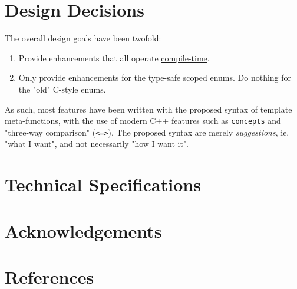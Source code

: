 \documentclass[
  format=manuscript,
  screen=true,
  review=false,
  nonacm=true,
  timestamp=true,
  balance=false]{acmart}
\begin{document}
\section{Design Decisions}

The overall design goals have been twofold:

\begin{enumerate}
\item Provide enhancements that all operate \underline{compile-time}.
\item Only provide enhancements for the type-safe scoped enums. Do nothing for the "old" C-style enums.
\end{enumerate}

\noindent
As such, most features have been written with the proposed syntax of template
meta-functions, with the use of modern C++ features such as \texttt{concepts} and
"three-way comparison" (\texttt{<=>}). The proposed syntax are merely
\textit{suggestions}, ie. "what I want", and not necessarily "how I want it".


\section{Technical Specifications}

\section{Acknowledgements}

\section{References}




\end{document}

